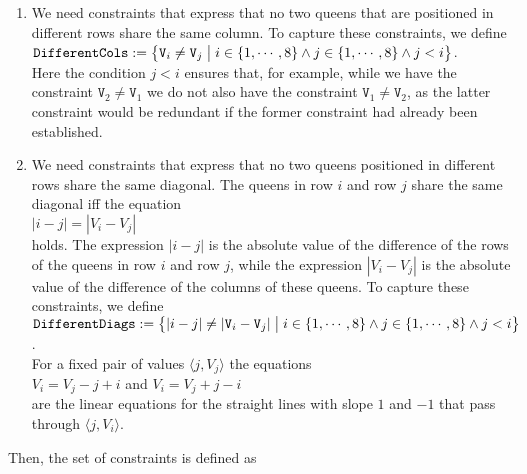 \begin{enumerate}
\item We need constraints that express that no two queens that are positioned in different rows share the same
      column.  To capture these constraints, we define
      \\[0.2cm]
      \hspace*{1.3cm}
      $\texttt{DifferentCols} := \bigl\{ \texttt{V}_i \not= \texttt{V}_j \bigm| i \in \{1,\cdots,8\} \wedge j \in \{1,\cdots,8\} \wedge j < i \bigr\}$.
      \\[0.2cm]
      Here the condition $j < i$ ensures that, for example,  while we have the constraint
      $\texttt{V}_2 \not=
      \texttt{V}_1$ we do not also have the constraint  $\texttt{V}_1 \not= \texttt{V}_2$, as the latter 
      constraint would be redundant if the former constraint had already been established.
\item We need constraints that express that no two queens positioned in different rows share the same 
      diagonal.  The queens in row $i$ and row $j$ share the same diagonal iff the equation
      \\[0.2cm]
      \hspace*{1.3cm}
      $|i - j| = |V_i - V_j|$
      \\[0.2cm]
      holds.  The expression $|i-j|$ is the absolute value of the difference of the rows of the queens in row
      $i$ and row $j$,  while the expression $|V_i - V_j|$ is the absolute value of the difference of the
      columns of these queens.  To capture these constraints, we define
      \\[0.2cm]
      \hspace*{1.3cm}
      $\texttt{DifferentDiags} := \bigl\{ |i  - j| \not= |\texttt{V}_i - \texttt{V}_j| \bigm| i \in \{1,\cdots,8\} \wedge j \in \{1,\cdots,8\} \wedge j < i \bigr\}$.
      \\[0.2cm]
      For a fixed pair of values $\langle j, V_j\rangle$ the equations
      \\[0.2cm]
      \hspace*{1.3cm}
      $V_i = V_j - j + i $ \quad and \quad $V_i = V_j + j - i$
      \\[0.2cm] 
      are the linear equations for the straight lines with slope $1$ and $-1$ that pass through
      $\langle j, V_i \rangle$.
\end{enumerate}
Then, the set of constraints is defined as 
\\[0.2cm]
\hspace*{1.3cm}
